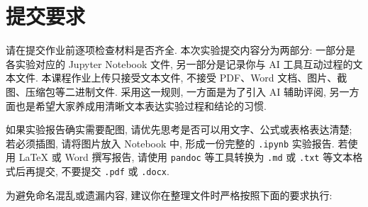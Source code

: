 \documentclass{../../nndlcourse}
\begin{document}
\section{提交要求}

请在提交作业前逐项检查材料是否齐全. 本次实验提交内容分为两部分: 一部分是各实验对应的 Jupyter Notebook 文件, 另一部分是记录你与 AI 工具互动过程的文本文件. 本课程作业上传只接受文本文件, 不接受 PDF、Word 文档、图片、截图、压缩包等二进制文件. 采用这一规则, 一方面是为了引入 AI 辅助评阅, 另一方面也是希望大家养成用清晰文本表达实验过程和结论的习惯.

如果实验报告确实需要配图, 请优先思考是否可以用文字、公式或表格表达清楚; 若必须插图, 请将图片放入 Notebook 中, 形成一份完整的 \texttt{.ipynb} 实验报告. 若使用 \LaTeX{} 或 Word 撰写报告, 请使用 \texttt{pandoc} 等工具转换为 \texttt{.md} 或 \texttt{.txt} 等文本格式后再提交, 不要提交 \texttt{.pdf} 或 \texttt{.docx}.

为避免命名混乱或遗漏内容, 建议你在整理文件时严格按照下面的要求执行:
\end{document}
